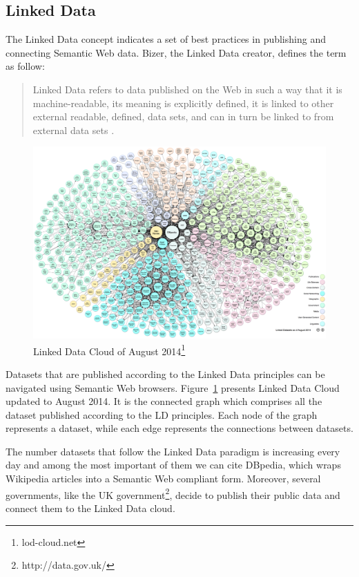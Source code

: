\subsection{Linked Data}\label{sec:ldata}

The Linked Data concept indicates a set of best practices in publishing and connecting Semantic Web data. Bizer, the Linked Data creator, defines the term as follow:

\begin{quote}
Linked Data refers to data published on the Web in such a way that it is machine-readable, its meaning is explicitly defined, it is linked to other external readable, defined, data sets, and can in turn be linked to from external data sets \cite{heath2011linked}.
\end{quote} 

\begin{figure}[tbh]
  \centering
	\includegraphics[width=\linewidth]{images/lod}
	\caption[Linked Data Cloud]{Linked Data Cloud of August 2014\footnote{lod-cloud.net}} 
  	\label{fig:lod}
\end{figure}

Datasets that are published according to the Linked Data principles can be navigated using Semantic Web browsers. Figure~\ref{fig:lod} presents  Linked Data Cloud updated to August 2014. It is the connected graph which comprises all the dataset published according to the LD principles. Each node of the graph represents a dataset, while each edge represents the connections between datasets.

The number datasets that follow the Linked Data paradigm is increasing every day and among the most important of them we can cite DBpedia, which wraps Wikipedia articles into a Semantic Web compliant form. Moreover, several governments, like the UK government\footnote{http://data.gov.uk/}, decide to publish their public data and connect them to the Linked Data cloud. 

